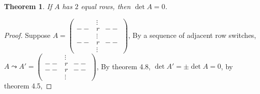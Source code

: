 \documentclass[12pt]{article}
\theoremstyle{plain}
\newtheorem{theorem}{Theorem}[subsection]
\begin{document}
\begin{theorem}
	If $A$ has $2$ equal rows, then $\det A = 0$. 
\end{theorem}
\begin{proof}
	Suppose 
	$A = \begin{pmatrix}
				& \vdots&	\\
			-- & r		&--	\\
				& \vdots&	\\
			-- & r		&--	\\
				& \vdots&
		\end{pmatrix}$, 
By a sequence of adjacent row switches, $A \leadsto A' = \begin{pmatrix}
				& \vdots&	\\
			-- & r		&--	\\
			-- & r		&--	\\
				& \vdots&
		\end{pmatrix}$, By theorem 4.8, $\det A' = \pm \det A = 0$, by theorem
		4.5, 
		
\end{proof}
\end{document}
